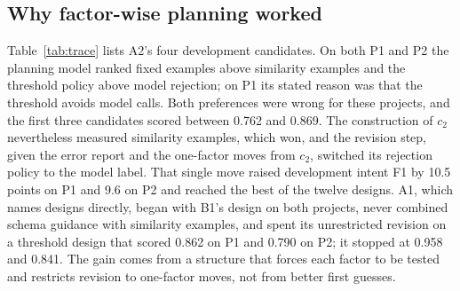 \documentclass[conference]{IEEEtran}
\begin{document}
\subsection{Why factor-wise planning worked}
\label{sec:trace}

Table~\ref{tab:trace} lists A2's four development candidates. On both P1 and P2 the planning model ranked fixed examples above similarity examples and the threshold policy above model rejection; on P1 its stated reason was that the threshold avoids model calls. Both preferences were wrong for these projects, and the first three candidates scored between 0.762 and 0.869. The construction of $c_2$ nevertheless measured similarity examples, which won, and the revision step, given the error report and the one-factor moves from $c_2$, switched its rejection policy to the model label. That single move raised development intent F1 by 10.5 points on P1 and 9.6 on P2 and reached the best of the twelve designs. A1, which names designs directly, began with B1's design on both projects, never combined schema guidance with similarity examples, and spent its unrestricted revision on a threshold design that scored 0.862 on P1 and 0.790 on P2; it stopped at 0.958 and 0.841. The gain comes from a structure that forces each factor to be tested and restricts revision to one-factor moves, not from better first guesses.

\begin{table}[t]
\centering
\caption{A2's development trace: intent macro-F1 / entity F1 of each candidate (100 development utterances)}
\label{tab:trace}
\small
\setlength{\tabcolsep}{3.5pt}
\end{table}
\end{document}
